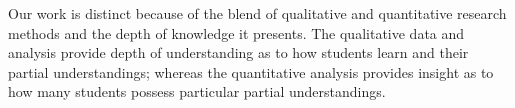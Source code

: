 Our work is distinct because of the blend of qualitative and quantitative
research methods and the depth of knowledge it presents. The qualitative data
and analysis provide depth of understanding as to how students learn and their
partial understandings; whereas the quantitative analysis provides insight as
to how many students possess particular partial understandings.
